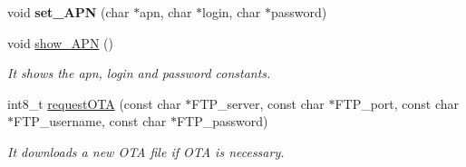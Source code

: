 \begin{DoxyCompactItemize}
\item 
void {\bfseries set\+\_\+\+A\+PN} (char $\ast$apn, char $\ast$login, char $\ast$password)\hypertarget{class_wasp_g_p_r_s___pro__core_ae93301497de288d2b2b517f6f9d9b604}{}\label{class_wasp_g_p_r_s___pro__core_ae93301497de288d2b2b517f6f9d9b604}

\item 
void \hyperlink{class_wasp_g_p_r_s___pro__core_a5885087c586ee1a05b75097735913934}{show\+\_\+\+A\+PN} ()
\begin{DoxyCompactList}\small\item\em It shows the apn, login and password constants. \end{DoxyCompactList}\item 
int8\+\_\+t \hyperlink{class_wasp_g_p_r_s___pro__core_a4e7125d46b95008c3e36ab4fd0dc4e80}{request\+O\+TA} (const char $\ast$F\+T\+P\+\_\+server, const char $\ast$F\+T\+P\+\_\+port, const char $\ast$F\+T\+P\+\_\+username, const char $\ast$F\+T\+P\+\_\+password)
\begin{DoxyCompactList}\small\item\em It downloads a new O\+TA file if O\+TA is necessary. \end{DoxyCompactList}\end{DoxyCompactItemize}

